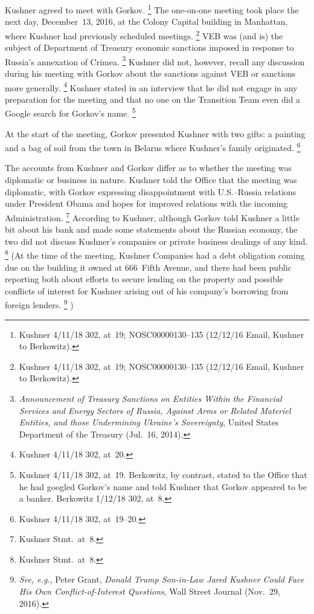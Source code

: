 Kushner agreed to meet with Gorkov.%
\footnote{Kushner 4/11/18 302, at~19;
NOSC00000130--135 (12/12/16 Email, Kushner to Berkowitz).}
The one-on-one meeting took place the next day, December~13, 2016, at the Colony Capital building in Manhattan, where Kushner had previously scheduled meetings.%
\footnote{Kushner 4/11/18 302, at~19;
NOSC00000130--135 (12/12/16 Email, Kushner to Berkowitz).}
VEB was (and is) the subject of Department of Treasury economic sanctions imposed in response to Russia's annexation of Crimea.%
\footnote{\textit{Announcement of Treasury Sanctions on Entities Within the Financial Services and Energy Sectors of Russia, Against Arms or Related Materiel Entities, and those Undermining Ukraine's Sovereignty}, United States Department of the Treasury (Jul.~16, 2014).}
Kushner did not, however, recall any discussion during his meeting with Gorkov about the sanctions against VEB or sanctions more generally.%
\footnote{Kushner 4/11/18 302, at~20.}
Kushner stated in an interview that he did not engage in any preparation for the meeting and that no one on the Transition Team even did a Google search for Gorkov's name.%
\footnote{Kushner 4/11/18 302, at~19.
Berkowitz, by contrast, stated to the Office that he had googled Gorkov's name and told Kushner that Gorkov appeared to be a banker.
Berkowitz 1/12/18 302, at~8.}

At the start of the meeting, Gorkov presented Kushner with two gifts: a painting and a bag of soil from the town in Belarus where Kushner's family originated.%
\footnote{Kushner 4/11/18 302, at~19--20.}

The accounts from Kushner and Gorkov differ as to whether the meeting was diplomatic or business in nature.
Kushner told the Office that the meeting was diplomatic, with Gorkov expressing disappointment with U.S.--Russia relations under President Obama and hopes for improved relations with the incoming Administration.%
\footnote{Kushner Stmt.\ at~8.}
According to Kushner, although Gorkov told Kushner a little bit about his bank and made some statements about the Russian economy, the two did not discuss Kushner's companies or private business dealings of any kind.%
\footnote{Kushner Stmt.\ at~8.}
(At the time of the meeting, Kushner Companies had a debt obligation coming due on the building it owned at 666~Fifth Avenue, and there had been public reporting both about efforts to secure lending on the property and possible conflicts of interest for Kushner arising out of his company's borrowing from foreign lenders.%
\footnote{\textit{See, e.g.}, Peter Grant, \textit{Donald Trump Son-in-Law Jared Kushner Could Face His Own Conflict-of-Interest Questions}, Wall Street Journal (Nov.~29, 2016).}%
)

